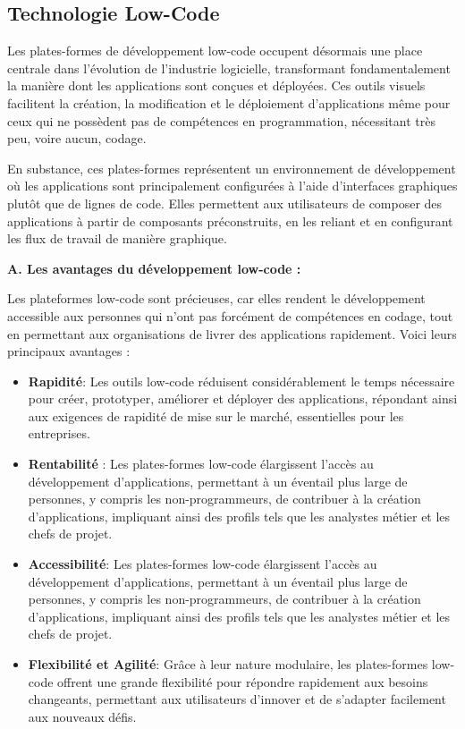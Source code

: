 \subsection{Technologie Low-Code}

\hspace{\parindent}Les plates-formes de développement low-code occupent désormais une place centrale dans l'évolution de l'industrie logicielle, transformant fondamentalement la manière dont les applications sont conçues et déployées. Ces outils visuels facilitent la création, la modification et le déploiement d'applications même pour ceux qui ne possèdent pas de compétences en programmation, nécessitant très peu, voire aucun, codage.

En substance, ces plates-formes représentent un environnement de développement où les applications sont principalement configurées à l'aide d'interfaces graphiques plutôt que de lignes de code. Elles permettent aux utilisateurs de composer des applications à partir de composants préconstruits, en les reliant et en configurant les flux de travail de manière graphique.

\textbf{A. Les avantages du développement low-code :}

Les plateformes low-code sont précieuses, car elles rendent le développement accessible aux personnes qui n'ont pas forcément de compétences en codage, tout en permettant aux organisations de livrer des applications rapidement. Voici leurs principaux avantages :

\begin{itemize}
    \item \textbf{Rapidité}: Les outils low-code réduisent considérablement le temps nécessaire pour créer, prototyper, améliorer et déployer des applications, répondant ainsi aux exigences de rapidité de mise sur le marché, essentielles pour les entreprises.

    \item \textbf{Rentabilité }: Les plates-formes low-code élargissent l'accès au développement d'applications, permettant à un éventail plus large de personnes, y compris les non-programmeurs, de contribuer à la création d'applications, impliquant ainsi des profils tels que les analystes métier et les chefs de projet.

    \item \textbf{Accessibilité}: Les plates-formes low-code élargissent l'accès au développement d'applications, permettant à un éventail plus large de personnes, y compris les non-programmeurs, de contribuer à la création d'applications, impliquant ainsi des profils tels que les analystes métier et les chefs de projet.

    \item \textbf{Flexibilité et Agilité}: Grâce à leur nature modulaire, les plates-formes low-code offrent une grande flexibilité pour répondre rapidement aux besoins changeants, permettant aux utilisateurs d'innover et de s'adapter facilement aux nouveaux défis.
\end{itemize}


